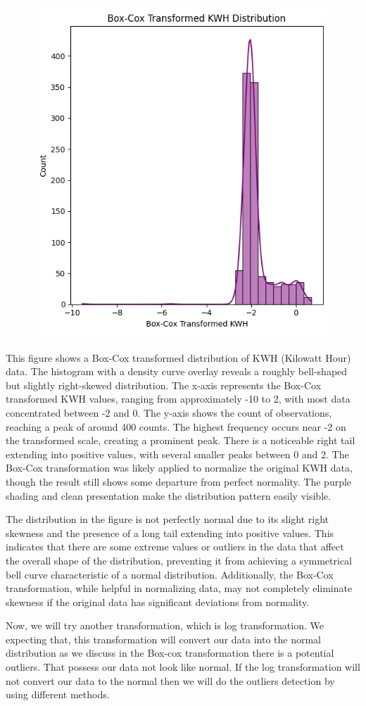 \documentclass[english,12pt, titlepage]{article}
\begin{document}
	\begin{figure}[!ht]
		\centering
		\includegraphics[width=0.5\linewidth]{fig2.jpg}
		\label{fig3}
	\end{figure}  
	This figure shows a Box-Cox transformed distribution of KWH (Kilowatt Hour) data. The histogram with a density curve overlay reveals a roughly bell-shaped but slightly right-skewed distribution. The x-axis represents the Box-Cox transformed KWH values, ranging from approximately -10 to 2, with most data concentrated between -2 and 0. The y-axis shows the count of observations, reaching a peak of around 400 counts. The highest frequency occurs near -2 on the transformed scale, creating a prominent peak. There is a noticeable right tail extending into positive values, with several smaller peaks between 0 and 2. The Box-Cox transformation was likely applied to normalize the original KWH data, though the result still shows some departure from perfect normality. The purple shading and clean presentation make the distribution pattern easily visible.
	
	The distribution in the figure is not perfectly normal due to its slight right skewness and the presence of a long tail extending into positive values. This indicates that there are some extreme values or outliers in the data that affect the overall shape of the distribution, preventing it from achieving a symmetrical bell curve characteristic of a normal distribution. Additionally, the Box-Cox transformation, while helpful in normalizing data, may not completely eliminate skewness if the original data has significant deviations from normality.
	
	Now, we will try another transformation, which is log transformation. We expecting that, this transformation will convert our data into the normal distribution as we discuss in the Box-cox transformation there is a potential outliers. That possess our data not look like normal. If the log transformation will not convert our data to the normal then we will do the outliers detection by using different methods. 
	
\end{document}
